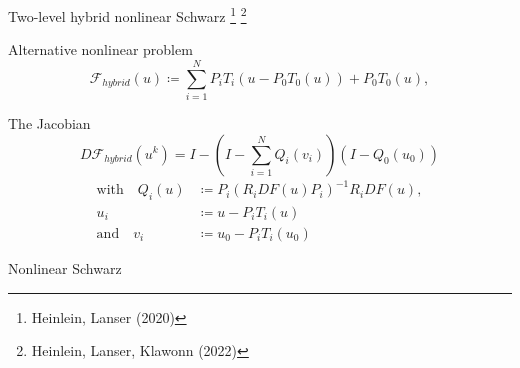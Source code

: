 \begin{frame}{Two-level hybrid nonlinear Schwarz  \footnote[3]{\tiny Heinlein, Lanser (2020)} \footnote[4]{\tiny Heinlein, Lanser, Klawonn (2022)}}
	\vspace*{-5mm}
	\begin{block}{\normalsize Alternative nonlinear problem}
		\begin{equation*}
			\mathcal{F}_{hybrid}(u) \coloneqq \sum_{i=1}^NP_iT_i(u-P_0T_0(u)) + P_0T_0(u),
		\end{equation*}
	\end{block}
	\begin{block}{\normalsize The Jacobian}
		\vspace*{-2mm}
		\begin{equation*}
			D\mathcal{F}_{hybrid}(u^k) = I - \left(I-\sum_{i=1}^NQ_i(v_i)\right)(I-Q_0(u_0))
		\end{equation*}
		\begin{align*}
			\text{with}\quad Q_i(u) & \coloneqq P_i(R_iDF(u)P_i)^{-1}R_iDF(u), \\
			u_i                     & \coloneqq u-P_iT_i(u)                    \\
			\text{and}\quad v_i     & \coloneqq u_0-P_iT_i(u_0)
		\end{align*}
	\end{block}
\end{frame}

\begin{frame}{Nonlinear Schwarz}%
    
\end{frame}
